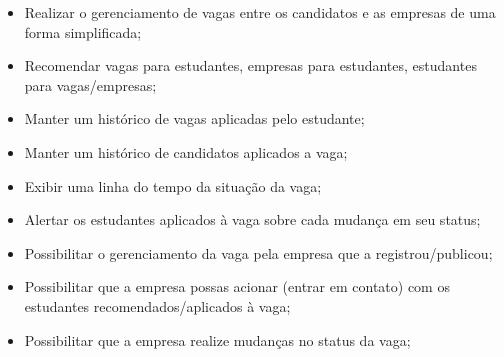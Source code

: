 \begin{itemize}
	\item Realizar o gerenciamento de vagas entre os candidatos e as empresas de uma forma simplificada;
	\item Recomendar vagas para estudantes, empresas para estudantes, estudantes para vagas/empresas;
	\item Manter um histórico de vagas aplicadas pelo estudante;
	\item Manter um histórico de candidatos aplicados a vaga;
	\item Exibir uma linha do tempo da situação da vaga;
	\item Alertar os estudantes aplicados à vaga sobre cada mudança em seu status;
	\item Possibilitar o gerenciamento da vaga pela empresa que a registrou/publicou;
	\item Possibilitar que a empresa possas acionar (entrar em contato) com os estudantes recomendados/aplicados à vaga;
	\item Possibilitar que a empresa realize mudanças no status da vaga;
\end{itemize}
	
